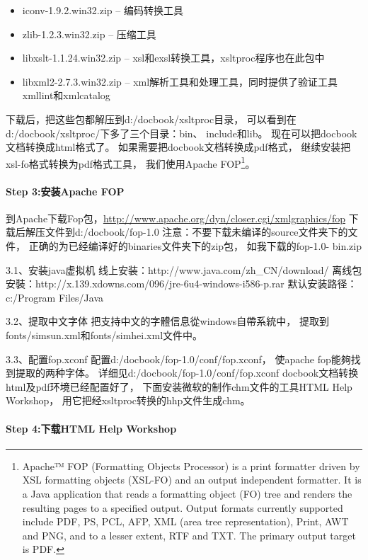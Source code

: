 \documentclass{book}
\begin{document}
\begin{itemize}
\item{iconv-1.9.2.win32.zip – 编码转换工具}
\item{zlib-1.2.3.win32.zip – 压缩工具}
\item{libxslt-1.1.24.win32.zip – xsl和exsl转换工具，xsltproc程序也在此包中}
\item{libxml2-2.7.3.win32.zip – xml解析工具和处理工具，同时提供了验证工具xmllint和xmlcatalog}
\end{itemize}

下载后，把这些包都解压到d:/docbook/xsltproc目录，
可以看到在d:/docbook/xsltproc/下多了三个目录：bin、 include和lib。
现在可以把docbook文档转换成html格式了。
如果需要把docbook文档转换成pdf格式，
继续安装把xsl-fo格式转换为pdf格式工具，
我们使用Apache FOP\footnote{Apache™ FOP (Formatting Objects Processor) 
is a print formatter driven by XSL formatting objects (XSL-FO) and an output independent formatter. 
It is a Java application that reads a formatting object (FO) tree 
and renders the resulting pages to a specified output. 
Output formats currently supported include PDF, PS, 
PCL, AFP, XML (area tree representation), Print, AWT and PNG, 
and to a lesser extent, RTF and TXT. The primary output target is PDF.}。

\paragraph{Step 3:安装Apache FOP}

到Apache下载Fop包，\url{http://www.apache.org/dyn/closer.cgi/xmlgraphics/fop}
下载后解压文件到d:/docbook/fop-1.0
注意：不要下载未编译的source文件夹下的文件，
正确的为已经编译好的binaries文件夹下的zip包，
如我下载的fop-1.0- bin.zip


3.1、安装java虚拟机
线上安装：http://www.java.com/zh\_CN/download/
离线包安裝：http://x.139.xdowns.com/096/jre-6u4-windows-i586-p.rar
默认安装路径：c:/Program Files/Java

3.2、提取中文字体
把支持中文的字體信息從windows自帶系統中，
提取到fonts/simsun.xml和fonts/simhei.xml文件中。

3.3、配置fop.xconf
配置d:/docbook/fop-1.0/conf/fop.xconf，
使apache fop能夠找到提取的两种字体。
详细见d:/docbook/fop-1.0/conf/fop.xconf
docbook文档转换html及pdf环境已经配置好了，
下面安装微软的制作chm文件的工具HTML Help Workshop，
用它把经xsltproc转换的hhp文件生成chm。

\paragraph{Step 4:下载HTML Help Workshop}
\end{document}
